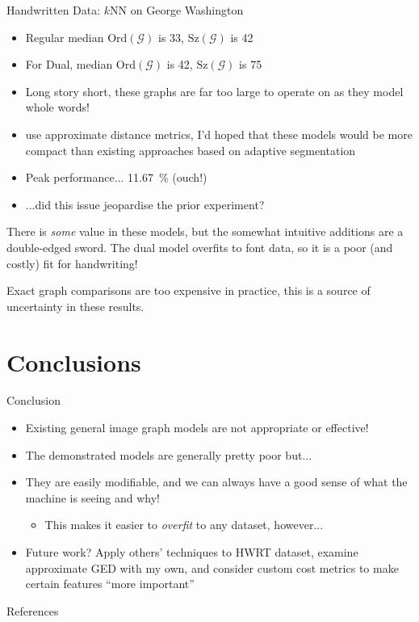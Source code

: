 \documentclass[10pt]{beamer}
\begin{document}
\begin{frame}{Handwritten Data: $k$NN on George Washington}
	\begin{itemize}
		\item Regular median $\text{Ord}(\mathcal{G})$ is 33, $\text{Sz}(\mathcal{G})$ is 42
		\item For Dual, median $\text{Ord}(\mathcal{G})$ is 42, $\text{Sz}(\mathcal{G})$ is 75
		\item Long story short, these graphs are \alert{far too large to operate on} as they model whole words!
		\item \citeauthor{Graphs-Handwriting} use approximate distance metrics, I'd hoped that these models would be more compact than existing approaches based on adaptive segmentation
		\item \alert{Peak performance... \SI{11.67}{\percent} (ouch!)}
		\item ...did this issue jeopardise the prior experiment?
	\end{itemize}
\end{frame}

\begin{frame}[standout]
	There is \emph{some} value in these models, but the somewhat intuitive additions are a double-edged sword.
	The dual model \alert{overfits} to font data, so it is a poor (and costly) fit for handwriting! 

	Exact graph comparisons are too expensive in practice, this is a source of uncertainty in these results.
\end{frame}

\section{Conclusions}


\begin{frame}{Conclusion}
	\begin{itemize}[<+- | alert@+>]
		\item Existing general image graph models are not appropriate or effective!
		\item The demonstrated models are generally pretty poor but...
		\item They are easily modifiable, and we can always have a good sense of what the machine is seeing and why!
		\begin{itemize}
			\item This makes it easier to \emph{overfit} to any dataset, however...
		\end{itemize}
		\item Future work? Apply others' techniques to HWRT dataset, examine approximate GED with my own, and consider custom cost metrics to make certain features ``more important''
	\end{itemize}
	
	\pause
	
\end{frame}

\appendix

\begin{frame}[allowframebreaks]{References}

\printbibliography[heading=none]

\end{frame}
\end{document}
